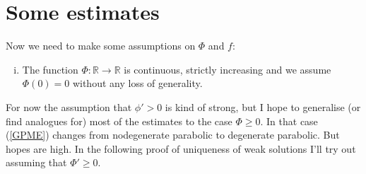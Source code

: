 \documentclass[11pt, a4paper]{article}
\begin{document}
\section{Some estimates}
Now we need to make some assumptions on $\Phi$ and $f$:
\begin{enumerate}[i)]
	\item The function $\Phi: \mathbb{R} \to \mathbb{R}$ is continuous, strictly increasing and we assume $\Phi(0) = 0$ without any loss of generality.
\end{enumerate}
For now the assumption that $\phi' > 0$ is kind of strong, but I hope to generalise (or find analogues for) most of the estimates to the case $\Phi \geq 0$. In that case (\ref{GPME}) changes from nodegenerate parabolic to degenerate parabolic. But hopes are high.
In the following proof of uniqueness of weak solutions I'll try out assuming that $\Phi' \geq 0$.
\end{document}
